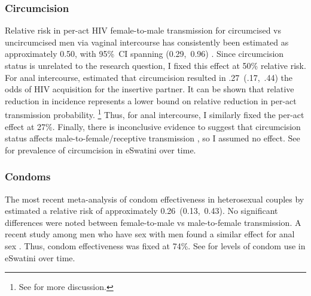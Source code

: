 \subsubsection{Circumcision}\label{model.par.beta.circ}
Relative risk in per-act HIV female-to-male transmission for circumcised vs uncircumcised men
via vaginal intercourse has consistently been estimated as
approximately 0.50, with 95\%~CI spanning (0.29,~0.96) \cite{Boily2009,Hughes2012,Patel2014}.
Since circumcision status is unrelated to the research question,
I fixed this effect at 50\% relative risk.
For anal intercourse, \citet{Wiysonge2011} estimated that circumcision resulted in
.27~(.17,~.44) the odds of HIV acquisition for the insertive partner.
It can be shown that relative reduction in incidence represents a lower bound
on relative reduction in per-act transmission probability.%
\footnote{See  for more discussion.}
Thus, for anal intercourse, I similarly fixed the per-act effect at 27\%.
Finally, there is inconclusive evidence to suggest that circumcision status affects
male-to-female/receptive transmission \cite{Weiss2009,Wiysonge2011}, so I assumed no effect.
See  for prevalence of circumcision in eSwatini over time.
\subsubsection{Condoms}\label{model.par.beta.condom}
The most recent meta-analysis of condom effectiveness in heterosexual couples by \citet{Giannou2016}
estimated a relative risk of approximately 0.26~(0.13,~0.43).
No significant differences were noted between female-to-male vs male-to-female transmission.
A recent study among men who have sex with men found
a similar effect for anal sex \cite{Smith2015}.
Thus, condom effectiveness was fixed at 74\%.
See  for levels of condom use in eSwatini over time.
